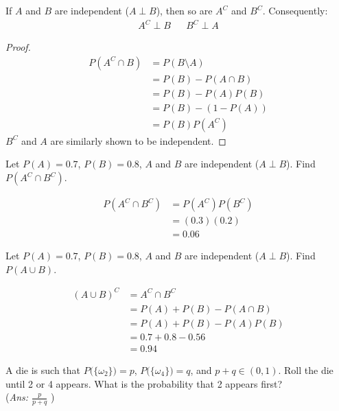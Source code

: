\documentclass{article}
\begin{document}
 \begin{thm}
 	If $A$ and $B$ are independent ($A \perp B$), then so are $A^C$ and $B^C$. Consequently:
 	\begin{align*}
 		A^C \perp B && B^C \perp A
 	\end{align*}
 \end{thm}
	\begin{proof}
		\begin{align*}
			P(A^C \cap B ) &= P (B \setminus A) \\
			&= P(B) - P(A \cap B) \\
			&= P(B) -P(A)P(B) \\
			&= P(B) - (1- P(A)) \\
			&= P(B) P(A^C)
		\end{align*}
		$B^C$ and $A$ are similarly shown to be independent.
	\end{proof}
	\hfill
	\begin{exmp}
		Let $P(A) = 0.7$, $P(B)=0.8$, $A$ and $B$ are independent ($A \perp B$). Find $P(A^C \cap B^C)$.
	\pagebreak
		\begin{sol}
			$ $
			\begin{align*}
				P(A^C\cap B^C) &= P(A^C)P(B^C)\\
				&= (0.3)(0.2)\\
				&\boxed{= 0.06}
			\end{align*}
		\end{sol}
	\end{exmp}
	\begin{exmp}
		Let $P(A) = 0.7$, $P(B)=0.8$, $A$ and $B$ are independent ($A\perp B$). Find $P(A \cup B)$.
		\begin{sol}
			\begin{align*}
				(A \cup B)^C &= A^C \cap B^C \\
				&= P(A) + P(B) - P(A \cap B) \\
				&= P(A) + P(B) - P(A)P(B)\\
				&= 0.7 + 0.8 - 0.56 \\
				&\boxed{=0.94}
			\end{align*}
		\end{sol}
	\end{exmp}
 	\begin{exe}
 		A die is such that $P\big( \{ \omega_2 \} \big) = p$, $P\big( \{\omega_4\} \big) = q$, and $p+q \in (0, 1)$. Roll the die until 2 or 4 appears. What is the probability that 2 appears first?\\
 		(\emph{Ans: $\frac{p}{p+q}$} )
 	\end{exe}
\end{document}
